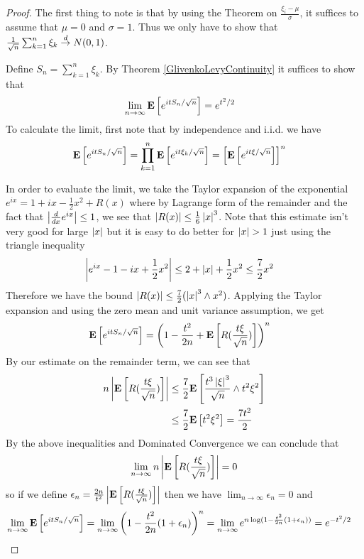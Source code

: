 \begin{proof}
The first thing to note is that by using the Theorem on $\frac{\xi_i -
  \mu}{\sigma}$, it suffices to assume that $\mu = 0$
and $\sigma = 1$.  Thus we only have to show that $\frac{1}{\sqrt{n}}
\sum_{k=1}^n \xi_k \overset{d}\to N(0,1)$.  

Define $S_n = \sum_{k=1}^n \xi_k$.  By Theorem
\ref{GlivenkoLevyContinuity} it suffices to show that 
\begin{align*}
\lim_{n \to \infty} \textbf{E}\left[e^{itS_n/\sqrt{n}}\right] &= e^{t^2/2}
\end{align*}
To calculate the limit, first note that by independence and i.i.d. we
have 
\begin{align*}
\textbf{E}\left[e^{itS_n/\sqrt{n}}\right] &= \prod_{k=1}^n
\textbf{E}\left[e^{it\xi_k/\sqrt{n}}\right]  = \left[\textbf{E}\left[e^{it\xi/\sqrt{n}}\right]\right]^n
\end{align*}

In order to evaluate the limit, we take the Taylor expansion of the exponential $e^{ix} = 1 + i x -
\frac{1}{2}x^2 + R(x)$ where by Lagrange form of the remainder and the
fact that $\left \vert \frac{d}{dx} e^{ix} \right \vert \leq 1$, we
see that $\left \vert R(x) \right \vert \leq \frac{1}{6}\left \vert x \right \vert^3$.  Note that this
estimate isn't very good for large $\left \vert x \right \vert$ but it is easy to do
better for $\left \vert x \right \vert > 1$ just using the triangle inequality
\begin{align*}
\left \vert e^{ix} - 1 - ix + \frac{1}{2}x^2 \right \vert &\leq 2 + \left \vert x \right \vert +
\frac{1}{2}x^2 \leq \frac{7}{2}x^2
\end{align*}
Therefore we have the bound $\left \vert R(x) \right \vert \leq \frac{7}{2}(\left \vert x \right \vert^3
\wedge x^2)$.  Applying the Taylor expansion and using the zero mean
and unit variance assumption, we get
\begin{align*}
\textbf{E}\left[e^{itS_n/\sqrt{n}}\right] &= \left(1 - \frac{t^2}{2n} + \textbf{E}\left[R(\frac{t\xi}{\sqrt{n}})\right]\right)^n
\end{align*}
By our estimate on the remainder term, we can see that
\begin{align*}
n \left \vert \textbf{E}\left[R(\frac{t\xi}{\sqrt{n}})\right] \right \vert &\leq
\frac{7}{2}\textbf{E}\left[\frac{t^3\left \vert \xi \right \vert^3}{\sqrt{n}} \wedge t^2
  \xi^2\right] \\
&\leq \frac{7}{2} \textbf{E}\left[ t^2
  \xi^2\right] = \frac{7t^2}{2} 
\end{align*}
By the above inequalities and Dominated Convergence we can
conclude that 
\begin{align*}
\lim_{n \to \infty} n
\left \vert \textbf{E}\left[R(\frac{t\xi}{\sqrt{n}})\right] \right \vert = 0
\end{align*}
so if we define $\epsilon_n = \frac{2n}{t^2}
\left \vert \textbf{E}\left[R(\frac{t\xi}{\sqrt{n}})\right] \right \vert$ then we have $\lim_{n
  \to \infty} \epsilon_n = 0$ and 
\begin{align*}
\lim_{n \to \infty} \textbf{E}\left[e^{itS_n/\sqrt{n}}\right] &= \lim_{n \to 
  \infty} \left(1 - \frac{t^2}{2n} (1 + \epsilon_n) \right)^n =\lim_{n \to 
  \infty}  e^{n \log(1 - \frac{t^2}{2n} (1 + \epsilon_n))} =
e^{-t^2/2}
\end{align*}
\end{proof}

